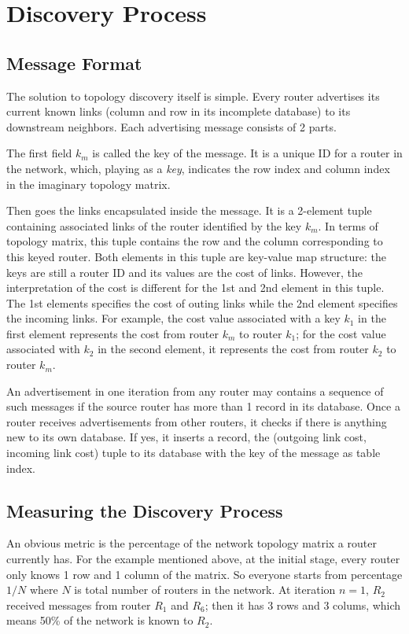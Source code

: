 \documentclass[12pt]{article}  %
\theoremstyle{definition}
\theoremstyle{remark}
\begin{document}
\section{Discovery Process}

\subsection{Message Format}
The solution to topology discovery itself is simple.
Every router advertises its current known links (column and row in its incomplete database) to its downstream neighbors.
Each advertising message consists of 2 parts.

The first field $k_m$ is called the key of the message.
It is a unique ID for a router in the network, which, playing as a \textit{key}, indicates the row index and column index in the imaginary topology matrix.

Then goes the links encapsulated inside the message.
It is a 2-element tuple containing associated links of the router identified by the key $k_m$.
In terms of topology matrix, this tuple contains the row and the column corresponding to this keyed router.
Both elements in this tuple are key-value map structure: the keys are still a router ID and its values are the cost of links.
However, the interpretation of the cost is different for the 1st and 2nd element in this tuple.
The 1st elements specifies the cost of outing links while the 2nd element specifies the incoming links.
For example, the cost value associated with a key $k_1$ in the first element represents the cost from router $k_m$ to router $k_1$;
for the cost value associated with $k_2$ in the second element, it represents the cost from router $k_2$ to router $k_m$.

An advertisement in one iteration from any router may contains a sequence of such messages if the source router has more than 1 record in its database.
Once a router receives advertisements from other routers, it checks if there is anything new to its own database.
If yes, it inserts a record, the (outgoing link cost, incoming link cost) tuple to its database with the key of the message as table index.

\subsection{Measuring the Discovery Process}
An obvious metric is the percentage of the network topology matrix a router currently has.
For the example mentioned above, at the initial stage, every router only knows 1 row and 1 column of the matrix.
So everyone starts from percentage $1/N$ where $N$ is total number of routers in the network.
At iteration $n=1$, $R_2$ received messages from router $R_1$ and $R_6$; then it has 3 rows and 3 colums, which means 50\% of the network is known to $R_2$.
\end{document}
